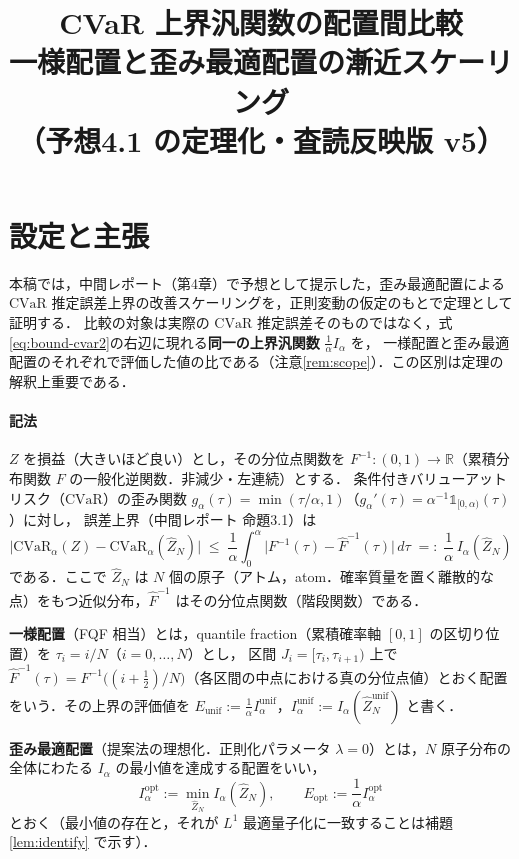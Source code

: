 \documentclass[a4paper,10pt]{jsarticle}
\title{CVaR 上界汎関数の配置間比較\\
  一様配置と歪み最適配置の漸近スケーリング\\
  （予想4.1 の定理化・査読反映版 v5）}
\author{}
\date{}
\theoremstyle{definition}
\newcommand{\CVaR}{\mathrm{CVaR}}
\newcommand{\Finv}{F^{-1}}
\newcommand{\Fhinv}{\hat{F}^{-1}}
\newcommand{\R}{\mathbb{R}}
\newcommand{\Eunif}{E_{\mathrm{unif}}}
\newcommand{\Eopt}{E_{\mathrm{opt}}}
\newcommand{\Iunif}{I_\alpha^{\mathrm{unif}}}
\newcommand{\Iopt}{I_\alpha^{\mathrm{opt}}}
\begin{document}
\maketitle

\section{設定と主張}
\label{sec:setting}

本稿では，中間レポート（第4章）で予想として提示した，歪み最適配置による $\CVaR$ 推定誤差上界の改善スケーリングを，正則変動の仮定のもとで定理として証明する．
比較の対象は実際の $\CVaR$ 推定誤差そのものではなく，式\eqref{eq:bound-cvar2}の右辺に現れる\textbf{同一の上界汎関数} $\frac1\alpha I_\alpha$ を，
一様配置と歪み最適配置のそれぞれで評価した値の比である（注意\ref{rem:scope}）．この区別は定理の解釈上重要である．

\paragraph{記法}
$Z$ を損益（大きいほど良い）とし，その分位点関数を $\Finv\colon(0,1)\to\R$（累積分布関数 $F$ の一般化逆関数．非減少・左連続）とする．
条件付きバリューアットリスク（$\CVaR$）の歪み関数 $g_\alpha(\tau)=\min(\tau/\alpha,1)$（$g_\alpha'(\tau)=\alpha^{-1}\mathbb{1}_{[0,\alpha)}(\tau)$）に対し，
誤差上界（中間レポート 命題3.1）は
\begin{equation}
  \bigl|\CVaR_\alpha(Z)-\CVaR_\alpha(\hat Z_N)\bigr|
  \;\le\;\frac1\alpha\int_0^\alpha\bigl|\Finv(\tau)-\Fhinv(\tau)\bigr|\,d\tau
  \;=:\;\frac1\alpha\,I_\alpha(\hat Z_N)
  \label{eq:bound-cvar2}
\end{equation}
である．ここで $\hat Z_N$ は $N$ 個の原子（アトム，atom．確率質量を置く離散的な点）をもつ近似分布，$\Fhinv$ はその分位点関数（階段関数）である．

\textbf{一様配置}（FQF 相当）とは，quantile fraction（累積確率軸 $[0,1]$ の区切り位置）を $\tau_i=i/N$（$i=0,\dots,N$）とし，
区間 $J_i=[\tau_i,\tau_{i+1})$ 上で $\Fhinv(\tau)=\Finv\bigl((i+\tfrac12)/N\bigr)$（各区間の中点における真の分位点値）とおく配置をいう．その上界の評価値を
$\Eunif:=\frac1\alpha\Iunif$，$\Iunif:=I_\alpha(\hat Z_N^{\mathrm{unif}})$ と書く．

\textbf{歪み最適配置}（提案法の理想化．正則化パラメータ $\lambda=0$）とは，$N$ 原子分布の全体にわたる $I_\alpha$ の最小値を達成する配置をいい，
\begin{equation}
  \Iopt:=\min_{\hat Z_N}I_\alpha(\hat Z_N),\qquad \Eopt:=\frac1\alpha\Iopt
  \label{eq:def-opt}
\end{equation}
とおく（最小値の存在と，それが $L^1$ 最適量子化に一致することは補題\ref{lem:identify} で示す）．
\end{document}
